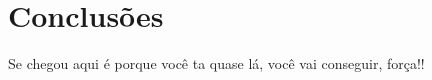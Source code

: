\chapter{Conclusões}
\label{chap7}

Se chegou aqui é porque você ta quase lá, você vai conseguir, força!!
